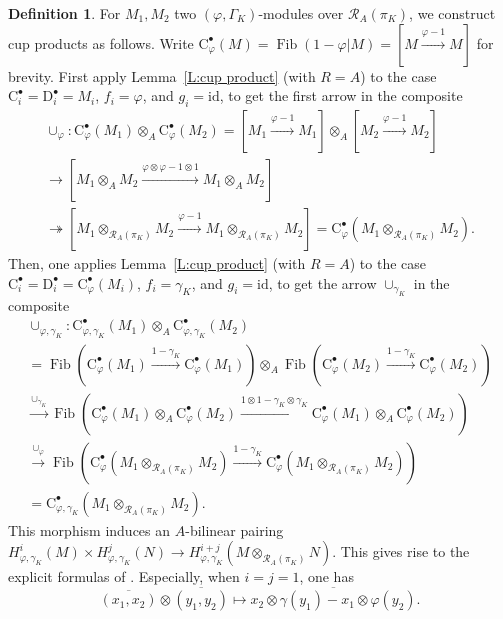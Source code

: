 \documentclass[12pt]{article}
\theoremstyle{definition}
\newtheorem{defn}[theorem]{Definition}
\numberwithin{equation}{theorem}
\newcommand{\calR}{\mathcal{R}}
\newcommand{\rmC}{\mathrm{C}}
\newcommand{\rmD}{\mathrm{D}}
\newcommand{\id}{\mathrm{id}}
\DeclareMathOperator{\Fib}{Fib}
\begin{document}
\begin{defn}
For $M_1,M_2$ two $(\varphi, \Gamma_K)$-modules over $\calR_A(\pi_K)$,
we construct cup products as follows.  Write $\rmC_\varphi^\bullet(M)
= \Fib(1-\varphi|M) = [M \xrightarrow{\varphi-1} M]$ for brevity.
First apply Lemma~\ref{L:cup product} (with $R=A$) to the case
$\rmC_i^\bullet = \rmD_i^\bullet = M_i$, $f_i = \varphi$, and $g_i =
\id$, to get the first arrow in the composite
\begin{multline*}
\cup_\varphi :
\rmC_\varphi^\bullet(M_1) \otimes_A \rmC_\varphi^\bullet(M_2)
= [M_1 \xrightarrow{\varphi-1} M_1]
  \otimes_A [M_2 \xrightarrow{\varphi-1} M_2] \\
\to
[M_1 \otimes_A M_2 \xrightarrow{\varphi \otimes \varphi - 1 \otimes 1}
  M_1 \otimes_A M_2] \\
\twoheadrightarrow
[M_1 \otimes_{\calR_A(\pi_K)} M_2 \xrightarrow{\varphi-1}
  M_1 \otimes_{\calR_A(\pi_K)} M_2]
= \rmC_\varphi^\bullet(M_1 \otimes_{\calR_A(\pi_K)} M_2).
\end{multline*}
Then, one applies
Lemma~\ref{L:cup product} (with $R=A$) to the case $\rmC_i^\bullet = \rmD_i^\bullet =
\rmC_\varphi^\bullet(M_i)$, $f_i = \gamma_K$, and $g_i = \id$, to get
the arrow $\cup_{\gamma_K}$ in the composite
\begin{multline*}
\cup_{\varphi,\gamma_K} :
\rmC_{\varphi,\gamma_K}^\bullet(M_1)
  \otimes_A
  \rmC_{\varphi,\gamma_K}^\bullet(M_2) \\
=
\Fib(\rmC_\varphi^\bullet(M_1) \xrightarrow{1-\gamma_K}
    \rmC_\varphi^\bullet(M_1))
  \otimes_A
  \Fib(\rmC_\varphi^\bullet(M_2) \xrightarrow{1-\gamma_K}
    \rmC_\varphi^\bullet(M_2)) \\
\xrightarrow{\cup_{\gamma_K}}
\Fib(\rmC_\varphi^\bullet(M_1) \otimes_A \rmC_\varphi^\bullet(M_2)
  \xrightarrow{1 \otimes 1 - \gamma_K \otimes \gamma_K}
  \rmC_\varphi^\bullet(M_1) \otimes_A \rmC_\varphi^\bullet(M_2)) \\
\xrightarrow{\cup_\varphi}
\Fib(\rmC_\varphi^\bullet(M_1 \otimes_{\calR_A(\pi_K)} M_2)
  \xrightarrow{1-\gamma_K}
  \rmC_\varphi^\bullet(M_1 \otimes_{\calR_A(\pi_K)} M_2)) \\
=
\rmC_{\varphi,\gamma_K}^\bullet(M_1 \otimes_{\calR_A(\pi_K)} M_2).
\end{multline*}
This morphism induces an $A$-bilinear pairing $H^i_{\varphi,
  \gamma_K}(M) \times H^j_{\varphi, \gamma_K}(N) \to H^{i+j}_{\varphi,
  \gamma_K}(M \otimes_{\calR_A(\pi_K)} N)$.  This gives rise to the
explicit formulas of \cite[\S4.2]{herr2}.  Especially, when $i=j=1$,
one has
\[
\overline{(x_1, x_2)} \otimes \overline{(y_1, y_2)} \mapsto \overline{x_2 \otimes \gamma(y_1) - x_1 \otimes \varphi(y_2)}.
\]


\end{defn}
\end{document}
